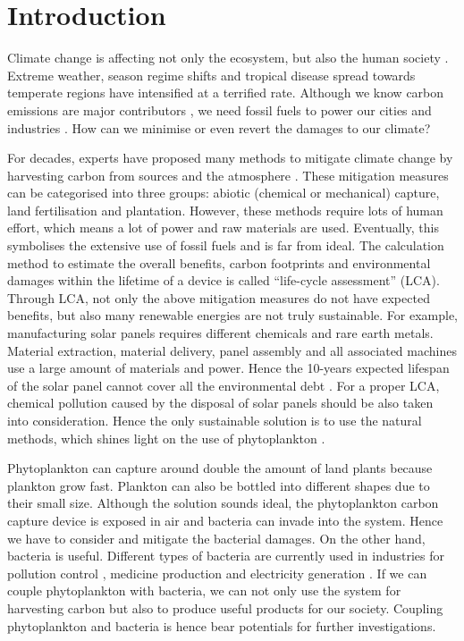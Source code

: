 \documentclass[../thesis.tex]{subfiles} %
\begin{document}
\section{Introduction}

Climate change is affecting not only the ecosystem, but also the human society \autocite{notz2016observed,schuur2015climate}.  Extreme weather, season regime shifts and tropical disease spread towards temperate regions have intensified at a terrified rate.  Although we know carbon emissions are major contributors \autocite{notz2016observed}, we need fossil fuels to power our cities and industries \autocite{ferguson2000electricity}.  How can we minimise or even revert the damages to our climate?

For decades, experts have proposed many methods to mitigate climate change by harvesting carbon from sources and the atmosphere \autocite{farrelly2013carbon,yang2008progress}.  These mitigation measures can be categorised into three groups: abiotic (chemical or mechanical) capture, land fertilisation and plantation.  However, these methods require lots of human effort, which means a lot of power and raw materials are used.  Eventually, this symbolises the extensive use of fossil fuels and is far from ideal.  The calculation method to estimate the overall benefits, carbon footprints and environmental damages within the lifetime of a device is called ``life-cycle assessment” (LCA).  Through LCA, not only the above mitigation measures do not have expected benefits, but also many renewable energies are not truly sustainable.  For example, manufacturing solar panels requires different chemicals and rare earth metals.  Material extraction, material delivery, panel assembly and all associated machines use a large amount of materials and power.  Hence the 10-years expected lifespan of the solar panel cannot cover all the environmental debt \autocite{martinopoulos2020rooftop}.  For a proper LCA, chemical pollution caused by the disposal of solar panels should be also taken into consideration.  Hence the only sustainable solution is to use the natural methods, which shines light on the use of phytoplankton \autocite{farrelly2013carbon}.

Phytoplankton can capture around double the amount of land plants \autocite{SCHLESINGER2013341} because plankton grow fast.  Plankton can also be bottled into different shapes \autocite{evanson_2019} due to their small size.  Although the solution sounds ideal, the phytoplankton carbon capture device is exposed in air and bacteria can invade into the system.  Hence we have to consider and mitigate the bacterial damages.  On the other hand, bacteria is useful.  Different types of bacteria are currently used in industries for pollution control \autocite{dash2013marine,naik2013lead}, medicine production \autocite{huang2012industrial} and electricity generation \autocite{songera2012electricity}.  If we can couple phytoplankton with bacteria, we can not only use the system for harvesting carbon but also to produce useful products for our society.  Coupling phytoplankton and bacteria is hence bear potentials for further investigations.
\end{document}
